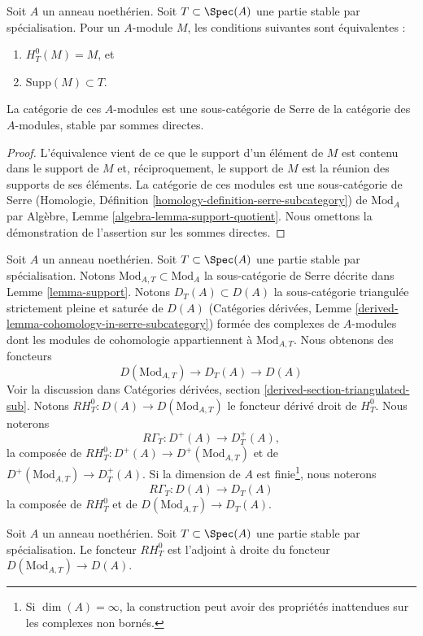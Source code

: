 \begin{lemma}
\label{lemma-support}
Soit $A$ un anneau noethérien. Soit $T \subset \Spec(A)$ une partie stable
par spécialisation. Pour un $A$-module $M$, les conditions suivantes sont équivalentes :
\begin{enumerate}
\item $H^0_T(M) = M$, et
\item $\text{Supp}(M) \subset T$.
\end{enumerate}
La catégorie de ces $A$-modules est une sous-catégorie de Serre
de la catégorie des $A$-modules, stable par sommes directes.
\end{lemma}

\begin{proof}
L'équivalence vient de ce que le support d'un élément de $M$
est contenu dans le support de $M$ et, réciproquement, le support de
$M$ est la réunion des supports de ses éléments.
La catégorie de ces modules est une sous-catégorie de Serre
(Homologie, Définition \ref{homology-definition-serre-subcategory})
de $\text{Mod}_A$ par
Algèbre, Lemme \ref{algebra-lemma-support-quotient}.
Nous omettons la démonstration de l'assertion sur les sommes directes.
\end{proof}

\noindent
Soit $A$ un anneau noethérien. Soit $T \subset \Spec(A)$ une partie stable
par spécialisation. Notons $\text{Mod}_{A, T} \subset \text{Mod}_A$
la sous-catégorie de Serre décrite dans Lemme \ref{lemma-support}.
Notons $D_T(A) \subset D(A)$ la
sous-catégorie triangulée strictement pleine et saturée de $D(A)$
(Catégories dérivées, Lemme \ref{derived-lemma-cohomology-in-serre-subcategory})
formée des complexes de $A$-modules dont les modules de cohomologie
appartiennent à $\text{Mod}_{A, T}$. Nous obtenons des foncteurs
$$
D(\text{Mod}_{A, T}) \to D_T(A) \to D(A)
$$
Voir la discussion dans
Catégories dérivées, section \ref{derived-section-triangulated-sub}.
Notons $RH^0_T : D(A) \to D(\text{Mod}_{A, T})$ le foncteur
dérivé droit de $H^0_T$. Nous noterons
$$
R\Gamma_T : D^+(A) \to D^+_T(A),
$$
la composée de $RH^0_T : D^+(A) \to D^+(\text{Mod}_{A, T})$ et de
$D^+(\text{Mod}_{A, T}) \to D^+_T(A)$. Si la dimension de $A$ est
finie\footnote{Si $\dim(A) = \infty$, la construction
peut avoir des propriétés inattendues sur les complexes non bornés.},
nous noterons
$$
R\Gamma_T : D(A) \to D_T(A)
$$
la composée de $RH^0_T$ et de
$D(\text{Mod}_{A, T}) \to D_T(A)$.

\begin{lemma}
\label{lemma-adjoint}
Soit $A$ un anneau noethérien. Soit $T \subset \Spec(A)$
une partie stable par spécialisation. Le foncteur
$RH^0_T$ est l'adjoint à droite du foncteur
$D(\text{Mod}_{A, T}) \to D(A)$.
\end{lemma}

